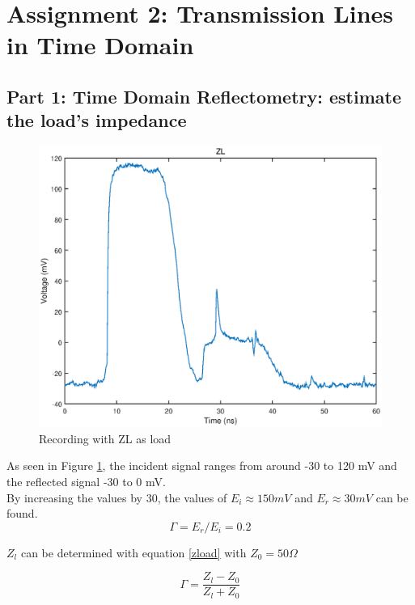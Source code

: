 \section*{Assignment 2: Transmission Lines in Time Domain}

\subsection*{Part 1: Time Domain Reflectometry: estimate the load’s impedance}

\begin{figure}[h!]
\centering
\includegraphics[width=\textwidth]{plots/ZL.eps}
\caption{Recording with ZL as load}
\label{fig:ZL}
\end{figure}

As seen in Figure \ref{fig:ZL}, the incident signal ranges from around -30 to 120 mV and the reflected signal -30 to 0 mV. \\
By increasing the values by 30, the values of $E_i \approx 150mV$ and $E_r \approx 30mV$ can be found. 
\begin{equation}
\Gamma = E_r/E_i = 0.2
\end{equation} 

$Z_l$ can be determined with equation \ref{zload} with $Z_0 = 50 \Omega$

\begin{equation}
\label{zload}
	\Gamma = \frac{Z_l-Z_0}{Z_l+Z_0}
\end{equation}

